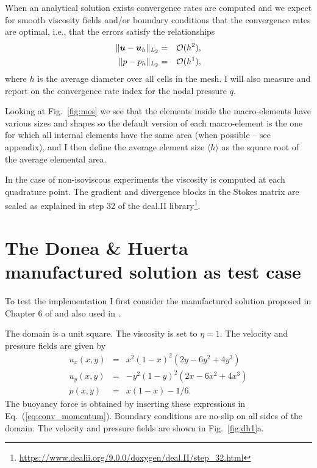 \documentclass[a4paper,12pt]{article}
\begin{document}
When an analytical solution exists convergence rates are computed and 
we expect for smooth viscosity fields and/or boundary conditions that the convergence rates 
are optimal, i.e., that the errors satisfy the relationships
\begin{eqnarray}
\| {\bm u} - {\bm u}_h \|_{L_2} &=&  {\cal O}(h^{2}),     \\  
\| p - p_h \|_{L_2}   &=& {\cal O}(h^{1}),
  \label{eq:error-rates}
\end{eqnarray}
where $h$ is the average diameter over all cells in the mesh.
I will also measure and report on the convergence rate index for the nodal pressure $q$.

Looking at Fig.~\ref{fig:mes} we see that the elements inside the macro-elements 
have various sizes and shapes so 
the default version of each macro-element is the one for which all internal elements have the same area
(when possible -- see appendix), and I then define the average element size
$\langle h \rangle$ as the square root of the average elemental area.

In the case of non-isoviscous experiments the viscosity is computed at each 
quadrature point. The gradient and divergence blocks in the Stokes matrix are
scaled as explained in step 32 of the deal.II library\footnote{\url{https://www.dealii.org/9.0.0/doxygen/deal.II/step_32.html}}.

\section{The Donea \& Huerta manufactured solution as test case}

To test the implementation I first consider the manufactured solution 
proposed in Chapter 6 of \cite{dohu03} and also used in \cite{thba22,thba25}.
 
The domain is a unit square. The viscosity is set to $\eta=1$.
The velocity and pressure fields are given by
\begin{eqnarray}
u_x(x,y) &=& x^2(1- x)^2 (2y - 6y^2 + 4y^3)  \\
u_y(x,y) &=& -y^2 (1 - y)^2 (2x - 6x^2 + 4x^3) \\
p(x,y) &=& x(1 -x)- 1/6. 
\end{eqnarray}
The buoyancy force is obtained by inserting these expressions in Eq.~(\ref{eq:conv_momentum}).
Boundary conditions are no-slip on all sides of the domain.
The velocity and pressure fields are shown in Fig.~\ref{fig:dh1}a.
\end{document}
